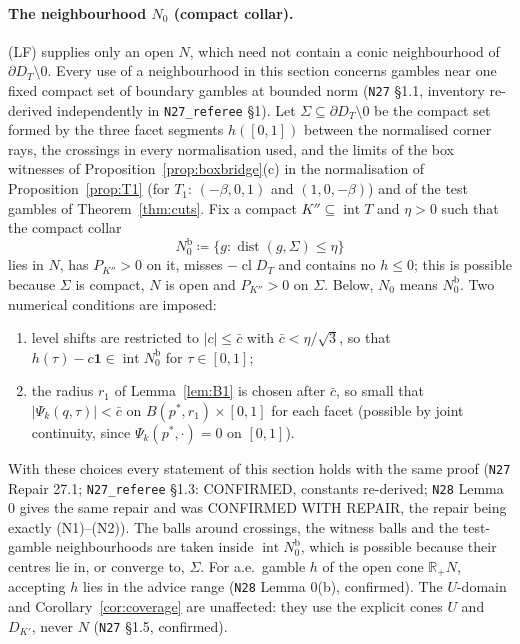 \documentclass[11pt]{article}
\theoremstyle{definition}
\theoremstyle{remark}
\newcommand{\R}{\mathbb R}
\newcommand{\one}{\mathbf 1}
\newcommand{\cl}{\operatorname{cl}}
\newcommand{\src}[1]{\texttt{#1}}
\newcommand{\Nb}{N_0^{\mathrm b}}
\begin{document}
\paragraph{The neighbourhood $N_0$ (compact collar).} (LF) supplies only an open $N$, which need not contain a conic neighbourhood of $\partial D_T\setminus0$. Every use of a neighbourhood in this section concerns gambles near one fixed compact set of boundary gambles at bounded norm (\src{N27} \S1.1, inventory re-derived independently in \src{N27\_referee} \S1). Let $\Sigma\subseteq\partial D_T\setminus0$ be the compact set formed by the three facet segments $h([0,1])$ between the normalised corner rays, the crossings in every normalisation used, and the limits of the box witnesses of Proposition~\ref{prop:boxbridge}(c) in the normalisation of Proposition~\ref{prop:T1} (for $T_1$: $(-\beta,0,1)$ and $(1,0,-\beta)$) and of the test gambles of Theorem~\ref{thm:cuts}. Fix a compact $K''\subseteq\operatorname{int}T$ and $\eta>0$ such that the compact collar
\[
\Nb\coloneqq\{g:\operatorname{dist}(g,\Sigma)\le\eta\}
\]
lies in $N$, has $P_{K''}>0$ on it, misses $-\cl D_T$ and contains no $h\le0$; this is possible because $\Sigma$ is compact, $N$ is open and $P_{K''}>0$ on $\Sigma$. Below, $N_0$ means $\Nb$. Two numerical conditions are imposed:
\begin{enumerate}[leftmargin=*,label=(N\arabic*)]
\item level shifts are restricted to $|c|\le\bar c$ with $\bar c<\eta/\sqrt3$, so that $h(\tau)-c\one\in\operatorname{int}\Nb$ for $\tau\in[0,1]$;
\item the radius $r_1$ of Lemma~\ref{lem:B1} is chosen after $\bar c$, so small that $|\Psi_k(q,\tau)|<\bar c$ on $B(p^*,r_1)\times[0,1]$ for each facet (possible by joint continuity, since $\Psi_k(p^*,\cdot)=0$ on $[0,1]$).
\end{enumerate}
With these choices every statement of this section holds with the same proof (\src{N27} Repair 27.1; \src{N27\_referee} \S1.3: CONFIRMED, constants re-derived; \src{N28} Lemma 0 gives the same repair and was CONFIRMED WITH REPAIR, the repair being exactly (N1)--(N2)). The balls around crossings, the witness balls and the test-gamble neighbourhoods are taken inside $\operatorname{int}\Nb$, which is possible because their centres lie in, or converge to, $\Sigma$. For a.e.\ gamble $h$ of the open cone $\R_+N$, accepting $h$ lies in the advice range (\src{N28} Lemma 0(b), confirmed). The $U$-domain and Corollary~\ref{cor:coverage} are unaffected: they use the explicit cones $U$ and $D_{K'}$, never $N$ (\src{N27} \S1.5, confirmed).
\end{document}
